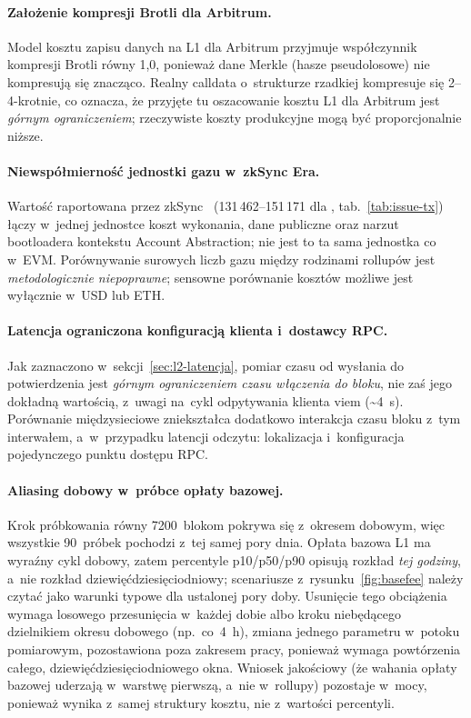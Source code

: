 \paragraph{Założenie kompresji Brotli dla Arbitrum.} Model kosztu zapisu danych na
L1 dla Arbitrum przyjmuje współczynnik kompresji Brotli równy 1{,}0, ponieważ dane
Merkle (hasze pseudolosowe) nie kompresują się znacząco. Realny calldata
o~strukturze rzadkiej kompresuje się 2--4-krotnie, co oznacza, że przyjęte tu
oszacowanie kosztu L1 dla Arbitrum jest \emph{górnym ograniczeniem}; rzeczywiste
koszty produkcyjne mogą być proporcjonalnie niższe.

\paragraph{Niewspółmierność jednostki gazu w~zkSync Era.} Wartość
 raportowana przez zkSync~\cite{zksync-era} (131\,462--151\,171
dla , tab.~\ref{tab:issue-tx}) łączy w~jednej jednostce koszt
wykonania, dane publiczne oraz narzut bootloadera kontekstu Account Abstraction;
nie jest to ta sama jednostka co  w~EVM. Porównywanie
surowych liczb gazu między rodzinami rollupów jest \emph{metodologicznie
niepoprawne}; sensowne porównanie kosztów możliwe jest wyłącznie w~USD lub ETH.

\paragraph{Latencja ograniczona konfiguracją klienta i~dostawcy RPC.} Jak
zaznaczono w~sekcji~\ref{sec:l2-latencja}, pomiar czasu od wysłania do
potwierdzenia jest \emph{górnym ograniczeniem czasu włączenia do bloku}, nie zaś
jego dokładną wartością, z~uwagi na~cykl odpytywania klienta viem
(\textasciitilde 4~s). Porównanie międzysieciowe zniekształca dodatkowo interakcja
czasu bloku z~tym interwałem, a~w~przypadku latencji odczytu: lokalizacja
i~konfiguracja pojedynczego punktu dostępu RPC.

\paragraph{Aliasing dobowy w~próbce opłaty bazowej.} Krok próbkowania równy
7200~blokom pokrywa się z~okresem dobowym, więc wszystkie 90~próbek pochodzi
z~tej samej pory dnia. Opłata bazowa L1 ma wyraźny cykl dobowy, zatem
percentyle p10/p50/p90 opisują rozkład \emph{tej godziny}, a~nie rozkład
dziewięćdziesięciodniowy; scenariusze z~rysunku~\ref{fig:basefee} należy czytać
jako warunki typowe dla ustalonej pory doby. Usunięcie tego obciążenia wymaga
losowego przesunięcia w~każdej dobie albo kroku niebędącego dzielnikiem okresu
dobowego (np.\ co~4~h), zmiana jednego parametru w~potoku pomiarowym,
pozostawiona poza zakresem pracy, ponieważ wymaga powtórzenia całego,
dziewięćdziesięciodniowego okna. Wniosek jakościowy (że wahania opłaty
bazowej uderzają w~warstwę pierwszą, a~nie w~rollupy) pozostaje w~mocy,
ponieważ wynika z~samej struktury kosztu, nie z~wartości percentyli.

